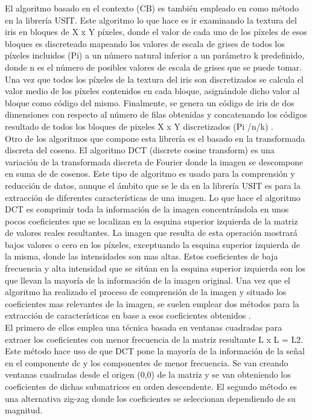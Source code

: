El algoritmo basado en el contexto (CB) es también empleado en como método en la librería USIT. Este algoritmo lo que hace es ir examinando la textura del iris en bloques de X x Y píxeles, donde el valor de cada uno de los píxeles de esos bloques es discreteado mapeando los valores de escala de grises de todos los píxeles incluidos (Pi) a un número natural inferior a un parámetro k predefinido, donde n es el número de posibles valores de escala de grises que se puede tomar. Una vez que todos los píxeles de la textura del iris son discretizados se calcula el valor medio de los píxeles contenidos en cada bloque, asignándole dicho valor al bloque como código del mismo. Finalmente, se genera un código de iris de dos dimensiones con respecto al número de filas obtenidas y concatenando los códigos resultado de todos los bloques de pixeles X x Y discretizados (Pi /n/k) \cite{Reference18} \cite{Reference19}. \\
 
Otro de los algoritmos que compone esta librería es el basado en la transformada  discreta del coseno. El algoritmo DCT (discrete cosine transform) es una variación de la transformada discreta de Fourier donde la imagen se descompone en suma de de cosenos. Este tipo de algoritmo es usado para la comprensión y reducción de datos, aunque el ámbito que se le da en la librería USIT es para la extracción de diferentes características de una imagen. Lo que hace el algoritmo DCT es comprimir toda la información de la imagen concentrándola en unos pocos coeficientes que se localizan en la esquina superior izquierda de la matriz de valores reales resultantes. La imagen que resulta de esta operación mostrará bajos valores o cero en los píxeles, exceptuando la esquina superior izquierda de la misma, donde las intensidades son mas altas. Estos coeficientes de baja frecuencia y alta intensidad que se sitúan en la esquina superior izquierda son los que llevan la mayoría de la información de la imagen original. Una vez que el algoritmo ha realizado el proceso de comprensión de la imagen y situado los coeficientes mas relevantes de la imagen, se suelen emplear dos métodos para la extracción de características en base a esos coeficientes obtenidos \cite{Reference18} \cite{Reference19}. \\

El primero de ellos emplea una técnica basada en ventanas cuadradas para extraer los coeficientes con menor frecuencia de la matriz resultante L x L = L2. Este método hace uso de que DCT pone la mayoría de la información de la señal en el componente dc y los componentes de menor frecuencia. Se van creando ventanas cuadradas desde el origen (0,0) de la matriz y se van obteniendo los coeficientes de dichas submatrices en orden descendente. El segundo método es una alternativa zig-zag donde los coeficientes se seleccionan dependiendo de su magnitud.\\

